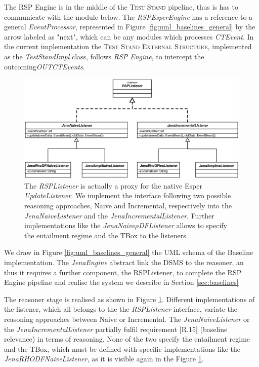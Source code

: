 The RSP Engine is in the middle of the \textsc{Test Stand} pipeline, thus is has to communicate with the module below. The \textit{RSPEsperEngine} has a reference to a general \textit{EventProcessor}, represented in Figure \ref{fig:uml_baselines_general}  by the arrow labeled as "next", which can be any modules which processes \textit{CTEvent}. In the current implementation the \textsc{Test Stand External Structure}, implemented as the \textit{TestStandImpl} class, follows \textit{RSP Engine}, to intercept the outcoming\textit{OUTCTEvents}.

\begin{figure}[tbh]
  \centering
	\includegraphics[width=\linewidth]{images/uml_baselines_listener}
	\caption[\textit{RSPListener} Implementations - UML Schema]{The \textit{RSPListener} is actually a proxy for the native Esper \textit{UpdateListener}. We implement the interface following two possible reasoning approaches, Naive and Incremental, respectively into the  \textit{JenaNaiveListener} and the \textit{JenaIncrementalListener}. Further implementations like the \textit{JenaNaive$\rho$DFListener} allows to specify the entailment regime and the TBox to the listeners.} 
  	\label{fig:uml_baselines_listener}
\end{figure}

We draw in Figure \ref{fig:uml_baselines_general} the UML schema of the Baseline implementation. The \textit{JenaEngine} abstract link the DSMS to the reasoner, an thus it requires a further component, the RSPListener, to complete the RSP Engine pipeline and realise the system we describe in Section \ref{sec:baselines}
 
The reasoner stage is realised as shown in Figure \ref{fig:uml_baselines_listener}. Different implementations of the listener, which all belongs to the the \textit{RSPListener} interface, variate the reasoning approaches between Naive or Incremental. The \textit{JenaNaiveListener} or the \textit{JenaIncrementalListener} partially fulfil requirement [R.15] (baseline relevance) in terms of reasoning. None of the two specify the entailment regime and the TBox, which must be defined with specific implementations like the \textit{JenaRHODFNaiveListener}, as it is visible again in the Figure \ref{fig:uml_baselines_listener}.

